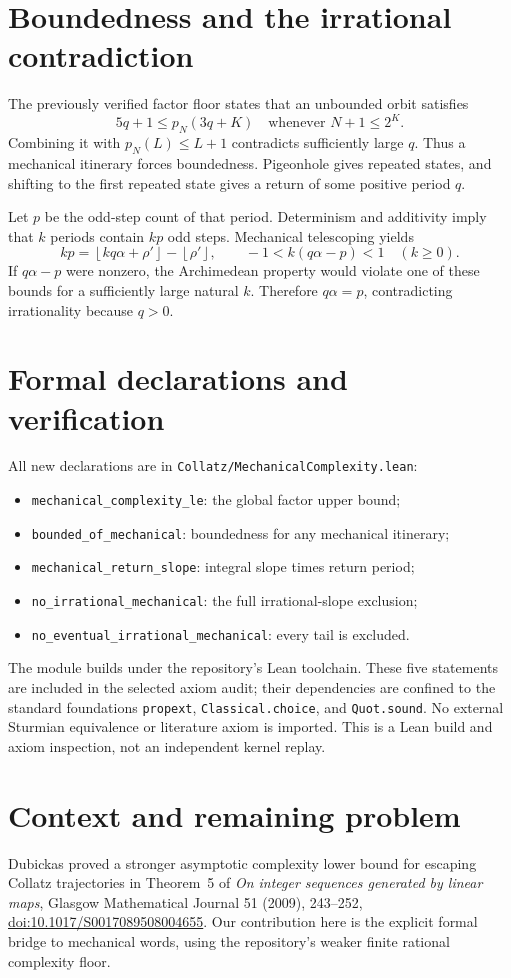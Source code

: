\documentclass[10pt]{article}
\newcommand{\floor}[1]{\left\lfloor#1\right\rfloor}
\begin{document}
\section{Boundedness and the irrational contradiction}
The previously verified factor floor states that an unbounded orbit satisfies
\[
5q+1\le p_N(3q+K)\quad\text{whenever }N+1\le2^K.
\]
Combining it with $p_N(L)\le L+1$ contradicts sufficiently large $q$.
Thus a mechanical itinerary forces boundedness. Pigeonhole gives repeated
states, and shifting to the first repeated state gives a return of some
positive period $q$.

Let $p$ be the odd-step count of that period. Determinism and additivity
imply that $k$ periods contain $kp$ odd steps. Mechanical telescoping yields
\[
kp=\floor{kq\alpha+\rho'}-\floor{\rho'},\qquad
-1<k(q\alpha-p)<1\quad(k\ge0).
\]
If $q\alpha-p$ were nonzero, the Archimedean property would violate one of
these bounds for a sufficiently large natural $k$. Therefore $q\alpha=p$,
contradicting irrationality because $q>0$.

\section{Formal declarations and verification}
All new declarations are in \texttt{Collatz/MechanicalComplexity.lean}:
\begin{itemize}
\item \texttt{mechanical\_complexity\_le}: the global factor upper bound;
\item \texttt{bounded\_of\_mechanical}: boundedness for any mechanical itinerary;
\item \texttt{mechanical\_return\_slope}: integral slope times return period;
\item \texttt{no\_irrational\_mechanical}: the full irrational-slope exclusion;
\item \texttt{no\_eventual\_irrational\_mechanical}: every tail is excluded.
\end{itemize}
The module builds under the repository's Lean toolchain. These five
statements are included in the selected axiom audit; their dependencies
are confined to the standard foundations \texttt{propext},
\texttt{Classical.choice}, and \texttt{Quot.sound}. No external Sturmian
equivalence or literature axiom is imported. This is a Lean build and
axiom inspection, not an independent kernel replay.

\section{Context and remaining problem}
Dubickas proved a stronger asymptotic complexity lower bound for escaping
Collatz trajectories in Theorem~5 of \emph{On integer sequences generated
by linear maps}, Glasgow Mathematical Journal 51 (2009), 243--252,
\href{https://doi.org/10.1017/S0017089508004655}{doi:10.1017/S0017089508004655}.
Our contribution here is the explicit formal bridge to mechanical words,
using the repository's weaker finite rational complexity floor.
\end{document}

